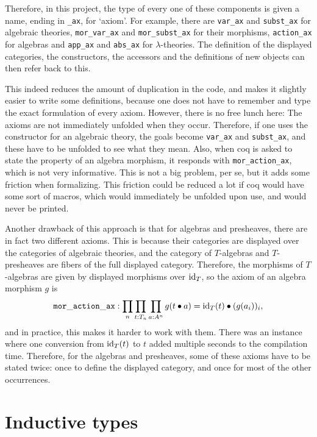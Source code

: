 Therefore, in this project, the type of every one of these components is given a name, ending in \texttt{\_ax}, for `axiom'. For example, there are \texttt{var\_ax} and \texttt{subst\_ax} for algebraic theories, \texttt{mor\_var\_ax} and \texttt{mor\_subst\_ax} for their morphisms, \texttt{action\_ax} for algebras and \texttt{app\_ax} and \texttt{abs\_ax} for $ \lambda $-theories. The definition of the displayed categories, the constructors, the accessors and the definitions of new objects can then refer back to this.

This indeed reduces the amount of duplication in the code, and makes it slightly easier to write some definitions, because one does not have to remember and type the exact formulation of every axiom. However, there is no free lunch here: The axioms are not immediately unfolded when they occur. Therefore, if one uses the constructor for an algebraic theory, the goals become \texttt{var\_ax} and \texttt{subst\_ax}, and these have to be unfolded to see what they mean. Also, when coq is asked to state the property of an algebra morphism, it responds with \texttt{mor\_action\_ax}, which is not very informative. This is not a big problem, per se, but it adds some friction when formalizing. This friction could be reduced a lot if coq would have some sort of macros, which would immediately be unfolded upon use, and would never be printed.

Another drawback of this approach is that for algebras and presheaves, there are in fact two different axioms. This is because their categories are displayed over the categories of algebraic theories, and the category of $ T $-algebras and $ T $-presheaves are fibers of the full displayed category. Therefore, the morphisms of $ T $-algebras are given by displayed morphisms over $ \text{id}_{T} $, so the axiom of an algebra morphism $ g $ is
\[ \mathtt{mor\_action\_ax}: \prod_n \prod_{t : T_n} \prod_{a : A^n} g (t \bullet a) = \text{id}_{T}(t) \bullet (g (a_i))_i, \]
and in practice, this makes it harder to work with them. There was an instance where one conversion from $ \text{id}_{T}(t) $ to $ t $ added multiple seconds to the compilation time. Therefore, for the algebras and presheaves, some of these axioms have to be stated twice: once to define the displayed category, and once for most of the other occurrences.

\section{Inductive types}

